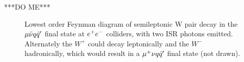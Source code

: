 ***DO ME***




\begin{figure}
  \centering
  
  
  \caption{Lowest order Feynman diagram of semileptonic W pair decay in the $\mu\bar{\nu} q\bar{q}'$ final state at $e^{+}e^{-}$ colliders, with two ISR photons emitted. Alternately the ${W}^{+}$ could decay leptonically and the ${W}^{-}$ hadronically, which would result in a $\mu^{+}\nu q\bar{q}'$ final state (not drawn).}
  \label{FEY:SemileptonicDecays}
\end{figure}
